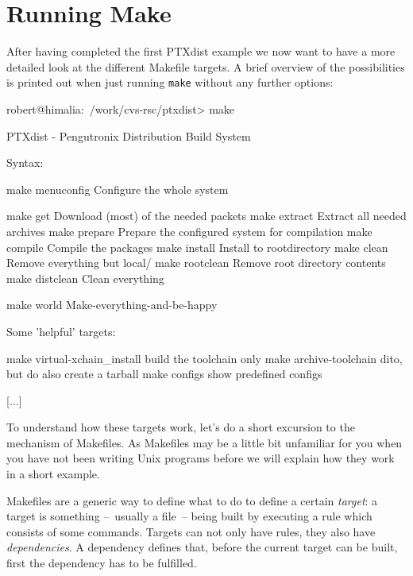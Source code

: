 \chapter{Running Make}				\label{chap:running-make}

After having completed the first PTXdist example we now want to have a
more detailed look at the different Makefile targets. A brief overview
of the possibilities is printed out when just running \texttt{make}
without any further options: 

\begin{code}
robert@himalia:~/work/cvs-rsc/ptxdist> make

PTXdist - Pengutronix Distribution Build System

Syntax:

  make menuconfig              Configure the whole system

  make get                     Download (most) of the needed packets
  make extract                 Extract all needed archives
  make prepare                 Prepare the configured system 
                               for compilation
  make compile                 Compile the packages
  make install                 Install to rootdirectory
  make clean                   Remove everything but local/
  make rootclean               Remove root directory contents
  make distclean               Clean everything

  make world                   Make-everything-and-be-happy

Some 'helpful' targets:

  make virtual-xchain_install  build the toolchain only
  make archive-toolchain       dito, but do also create a tarball
  make configs                 show predefined configs

[...]
 
\end{code}

To understand how these targets work, let's do a short excursion to the
mechanism of Makefiles. As Makefiles may be a little bit unfamiliar for
you when you have not been writing Unix programs before we will explain
how they work in a short example. 

Makefiles are a generic way to define what to do to define a certain
\emph{target}: a target is something --~usually a file~-- being built by
executing a rule which consists of some commands.  Targets can not only
have rules, they also have \emph{dependencies}. A dependency defines
that, before the current target can be built, first the dependency has
to be fulfilled. 

